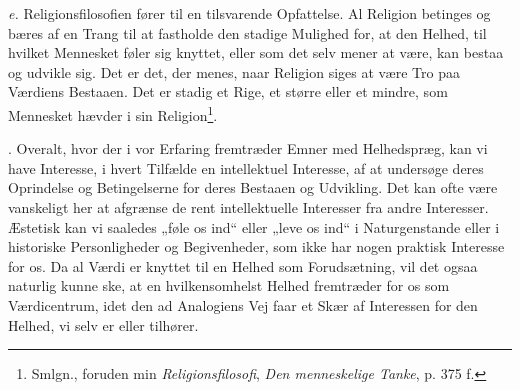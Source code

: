 \documentclass[12pt]{article}
\begin{document}
\textit{e.} Religionsfilosofien fører til en tilsvarende Opfattelse. Al Religion
betinges og bæres af en Trang til at fastholde den stadige Mulighed for, at den
Helhed, til hvilket Mennesket føler sig knyttet, eller som det selv mener at
være, kan bestaa og udvikle sig. Det er det, der menes, naar Religion siges at
være Tro paa Værdiens Bestaaen. Det er stadig et Rige, et større eller et
mindre, som Mennesket hævder i sin Religion\footnote{Smlgn., foruden min
\textit{Religionsfilosofi}, \textit{Den menneskelige Tanke}, p. 375 f.}.

. Overalt, hvor der i vor Erfaring fremtræder Emner med Helhedspræg, kan vi
have Interesse, i hvert Tilfælde en intellektuel Interesse, af at undersøge
deres Oprindelse og Betingelserne for deres Bestaaen og Udvikling. Det kan ofte
være vanskeligt her at afgrænse de rent intellektuelle Interesser fra andre
Interesser. Æstetisk kan vi saaledes „føle os ind“ eller „leve os ind“ i
Naturgenstande eller i historiske Personligheder og Begivenheder, som ikke har
nogen praktisk Interesse for os. Da al Værdi er knyttet til en Helhed som
Forudsætning, vil det ogsaa naturlig kunne ske, at en hvilkensomhelst Helhed
fremtræder for os som Værdicentrum, idet den ad Analogiens Vej faar et Skær af
Interessen for den Helhed, vi selv er eller tilhører.
\end{document}
